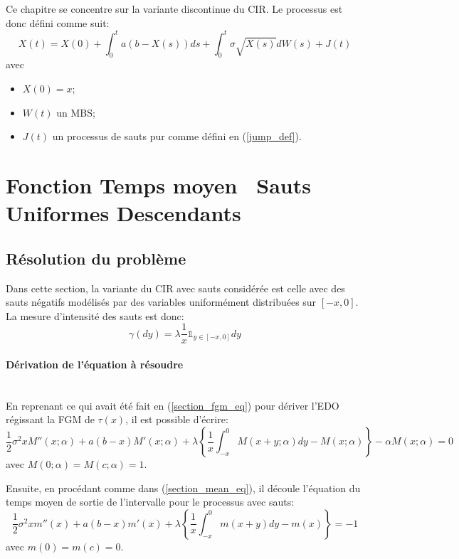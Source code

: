 \label{sec:FPT_Jump}
Ce chapitre se concentre sur la variante discontinue du \acs{CIR}. Le processus est donc défini comme suit:
\begin{equation}\label{jump_cir_sde}
    X(t)=X(0)+\int_0^t a(b-X(s))ds+\int_0^t\sigma\sqrt{X(s)}dW(s)+J(t)
\end{equation}
avec
\begin{itemize}
    \item $X(0)=x$;
    \item $W(t)$ un \acs{MBS};
    \item $J(t)$ un processus de sauts pur comme défini en (\ref{jump_def}).
\end{itemize}

\section{Fonction Temps moyen \textemdash~Sauts Uniformes Descendants}\label{subsection_mean_jumps}
\subsection{Résolution du problème}
Dans cette section, la variante du \ac{CIR} avec sauts considérée est celle avec des sauts négatifs modélisés par des variables uniformément distribuées sur $[-x,0]$. La mesure d'intensité des sauts est donc:
\[
\gamma(dy)=\lambda\frac{1}{x}\mathds{1}_{y\in[-x,0]}dy
\]

\paragraph{Dérivation de l'équation à résoudre}\phantom{}\\
En reprenant ce qui avait été fait en (\ref{section_fgm_eq}) pour dériver l'\acs{EDO} régissant la \acl{FGM} de $\tau(x)$, il est possible d'écrire:
\[
\frac{1}{2}\sigma^2 xM''(x;\alpha)+a(b-x)M'(x;\alpha)+\lambda\left\{\frac{1}{x}\int_{-x}^0M(x+y;\alpha)dy-M(x;\alpha)\right\}-\alpha M(x;\alpha)=0
\]
avec $M(0;\alpha)=M(c;\alpha)=1$.

Ensuite, en procédant comme dans (\ref{section_mean_eq}), il découle l'équation du temps moyen de sortie de l'intervalle pour le processus avec sauts:
\begin{equation}\label{mean_ide}
    \frac{1}{2}\sigma^2 xm''(x)+a(b-x)m'(x)+\lambda\left\{\frac{1}{x}\int_{-x}^0m(x+y)dy-m(x)\right\}=-1
\end{equation}
avec $m(0)=m(c)=0$.

